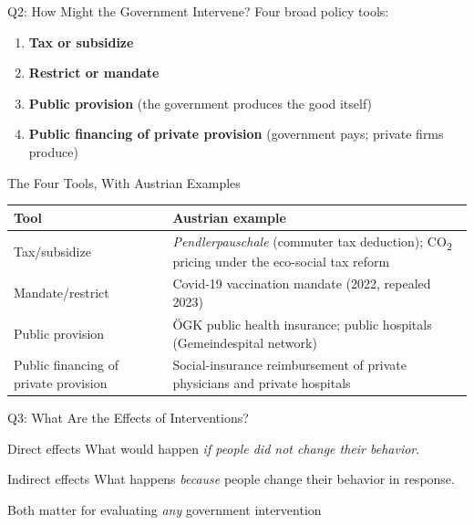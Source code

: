 \documentclass[11pt,aspectratio=169]{beamer}
\begin{document}
\begin{frame}{Q2: How Might the Government Intervene?}
  Four broad policy tools:
  \begin{enumerate}
    \item \textbf{Tax or subsidize}
    \item \textbf{Restrict or mandate}
    \item \textbf{Public provision} (the government produces the good itself)
    \item \textbf{Public financing of private provision} (government pays; private firms produce)
  \end{enumerate}
\end{frame}

\begin{frame}{The Four Tools, With Austrian Examples}
  \begin{center}
  \small
  \begin{tabular}{@{}p{3.4cm}p{8.5cm}@{}}
    \toprule
    \textbf{Tool} & \textbf{Austrian example} \\
    \midrule
    Tax/subsidize & \emph{Pendlerpauschale} (commuter tax deduction); CO\textsubscript{2} pricing under the eco-social tax reform \\[0.4em]
    Mandate/restrict & Covid-19 vaccination mandate (2022, repealed 2023) \\[0.4em]
    Public provision & ÖGK public health insurance; public hospitals (Gemeindespital network) \\[0.4em]
    Public financing of private provision & Social-insurance reimbursement of private physicians and private hospitals \\
    \bottomrule
  \end{tabular}
  \end{center}
\end{frame}

\begin{frame}{Q3: What Are the Effects of Interventions?}
  \begin{block}{Direct effects}
    What would happen \emph{if people did not change their behavior}.
  \end{block}
  \begin{block}{Indirect effects}
    What happens \emph{because} people change their behavior in response.
  \end{block}
  \vspace{1em}
  \centering
  Both matter for evaluating \emph{any} government intervention
\end{frame}
\end{document}
